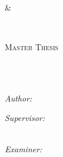 
\begin{titlepage}
	\begin{center}

		{\scshape\LARGE \univone\\
			\&\par
			\univtwo\\
			\par}\vspace{1.5cm} %

		\textsc{\Large Master Thesis}\\[0.5cm] %

		\HRule \\[0.4cm] %
		{\huge \bfseries \ttitle\par}\vspace{0.4cm} %

		\HRule \\[1.5cm] %

		\begin{minipage}[t]{0.3\textwidth}
			\begin{flushleft} \large
				\emph{Author:}\\
				{\authorname} %
			\end{flushleft}
		\end{minipage}
		\begin{minipage}[t]{0.5\textwidth}
			\begin{flushright}
				\large
				\emph{Supervisor:} \\
				\supname \\
				\emph{\univtwo}
				\vspace{1cm}

				\large
				\emph{Examiner:} \\
				\examname \\
				\emph{\univone}
				\vspace{1cm}
			\end{flushright}
		\end{minipage}\\[3cm]


\end{center}
\end{titlepage}
